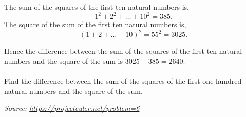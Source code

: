 \vspace{10pt}
\begin{graybox}
The sum of the squares of the first ten natural numbers is,
\[1^2 + 2^2 + \ldots + 10^2 = 385.\]
The square of the sum of the first ten natural numbers is,
\[(1 + 2 + \ldots + 10)^2 = 55^2 = 3025.\]

Hence the difference between the sum of the squares of the first ten natural numbers and the square of the sum is $3025 - 385 = 2640$.\\~\\
Find the difference between the sum of the squares of the first one hundred natural numbers and the square of the sum.
\begin{flushleft}
{\color{gray}\textit{Source: \url{https://projecteuler.net/problem=6}}}
\end{flushleft}
\end{graybox}
